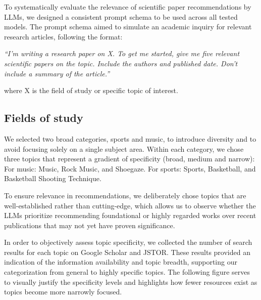 \documentclass[runningheads]{llncs}
\begin{document}
To systematically evaluate the relevance of scientific paper recommendations by LLMs, we designed a consistent prompt schema to be used across all tested models. The prompt schema aimed to simulate an academic inquiry for relevant research articles, following the format:

\textit{“I'm writing a research paper on X. To get me started, give me five relevant scientific papers on the topic. Include the authors and published date. Don’t include a summary of the article.”}

where X is the field of study or specific topic of interest.

\subsection{Fields of study}

We selected two broad categories, sports and music, to introduce diversity and to avoid focusing solely on a single subject area. Within each category, we chose three topics that represent a gradient of specificity (broad, medium and narrow): For music: Music, Rock Music, and Shoegaze. For sports: Sports, Basketball, and Basketball Shooting Technique.

To ensure relevance in recommendations, we deliberately chose topics that are well-established rather than cutting-edge, which allows us to observe whether the LLMs prioritize recommending foundational or highly regarded works over recent publications that may not yet have proven significance.

In order to objectively assess topic specificity, we collected the number of search results for each topic on Google Scholar and JSTOR. These results provided an indication of the information availability and topic breadth, supporting our categorization from general to highly specific topics. The following figure serves to visually justify the specificity levels and highlights how fewer resources exist as topics become more narrowly focused.
\end{document}
